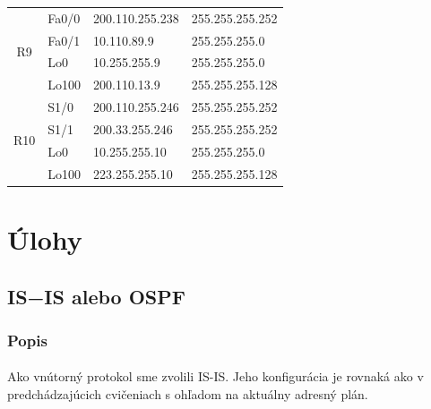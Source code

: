 \documentclass[12pt,twoside,a4paper]{report}
\begin{document}
\begin{table}[!htbp]
\begin{tabular}{|c|l|l|l|}
\multirow{4}{*}{R9}  & Fa0/0                                   & 200.110.255.238                         & 255.255.255.252                     \\ \cline{2-4} 
                     & Fa0/1                                   & 10.110.89.9                             & 255.255.255.0                       \\ \cline{2-4} 
                     & Lo0                                     & 10.255.255.9                            & 255.255.255.0                       \\ \cline{2-4} 
                     & Lo100                                   & 200.110.13.9                            & 255.255.255.128                     \\ \hline
\multirow{4}{*}{R10} & S1/0                                    & 200.110.255.246                         & 255.255.255.252                     \\ \cline{2-4} 
                     & S1/1                                    & 200.33.255.246                          & 255.255.255.252                     \\ \cline{2-4} 
                     & Lo0                                     & 10.255.255.10                           & 255.255.255.0                       \\ \cline{2-4} 
                     & Lo100                                   & 223.255.255.10                          & 255.255.255.128                     \\ \hline
\end{tabular}
\end{table}


\clearpage

\section{Úlohy}
\subsection{IS−IS alebo OSPF}
\subsubsection{Popis}
\paragraph{}
Ako vnútorný protokol sme zvolili IS-IS. Jeho konfigurácia je rovnaká ako v predchádzajúcich cvičeniach s ohľadom na aktuálny adresný plán.
\end{document}
